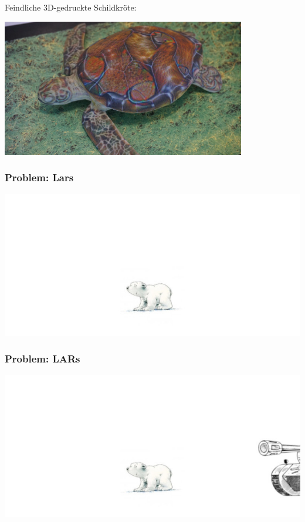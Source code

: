 \documentclass[aspectratio=169,x11names]{beamer}
\begin{document}
\begin{frame}

\begin{center}
Feindliche 3D-gedruckte Schildkröte:
\end{center}

\begin{center}
\includegraphics[width=0.8\textwidth]{images/rifle_turtle.jpg} 
\end{center}
\end{frame}

\begin{frame}
\frametitle{Problem: Lars}

\begin{center}
\includegraphics[width=1.067\textwidth]{images/lars1.jpg} 
\end{center}
\end{frame}

\begin{frame}
\frametitle{Problem: LARs}

\begin{center}
\includegraphics[width=1.067\textwidth]{images/lars2.jpg} 
\end{center}
\end{frame}
\end{document}
